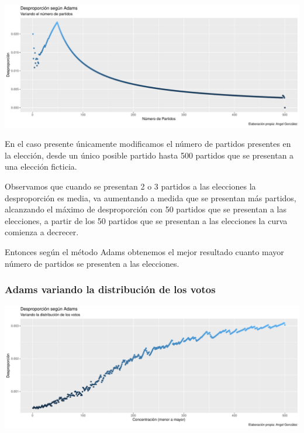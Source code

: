 \documentclass[12pt,a4paper,]{book}
\numberwithin{dummy}{section}
\theoremstyle{ocrenumbox}
\theoremstyle{blacknumex}
\theoremstyle{blacknumbox}
\theoremstyle{ocrenum}
\theoremstyle{ocrenum}
\begin{document}
\begin{center}\includegraphics[width=0.95\linewidth]{figurasR/unnamed-chunk-35-1} \end{center}

En el caso presente únicamente modificamos el número de partidos
presentes en la elección, desde un único posible partido hasta 500
partidos que se presentan a una elección ficticia.

Observamos que cuando se presentan 2 o 3 partidos a las elecciones la
desproporción es media, va aumentando a medida que se presentan más
partidos, alcanzando el máximo de desproporción con 50 partidos que se
presentan a las elecciones, a partir de los 50 partidos que se presentan
a las elecciones la curva comienza a decrecer.

Entonces según el método Adams obtenemos el mejor resultado cuanto mayor
número de partidos se presenten a las elecciones.

\hypertarget{adams-variando-la-distribuciuxf3n-de-los-votos}{%
\subsubsection{Adams variando la distribución de los
votos}\label{adams-variando-la-distribuciuxf3n-de-los-votos}}

\begin{center}\includegraphics[width=0.95\linewidth]{figurasR/unnamed-chunk-36-1} \end{center}
\end{document}
